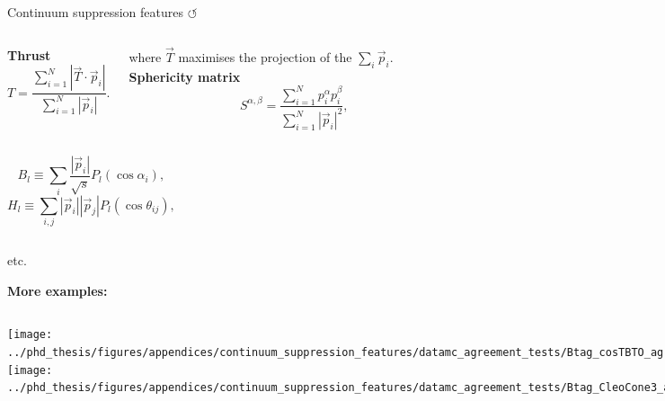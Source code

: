 \documentclass[xcolor=dvipsnames]{beamer}
\begin{document}
\begin{frame}{Continuum suppression features \hyperlink{frame:A}{$\circlearrowleft$}}
\scriptsize\centering
   \begin{columns}
      \centering
      \textbf{Thrust}
      \begin{equation*}\label{eq:thrust}
         T = \frac{\sum^N_{i=1}|\vec{T}\cdot\vec{p}_i|}{\sum^N_{i=1}|\vec{p}_i|}.
     \end{equation*}

     where $\vec{T}$ maximises the projection of the $\sum_i\vec{p}_i$.
     \centering
     \textbf{Sphericity matrix}
     \begin{equation*}
      S^{\alpha,\beta} = \frac{\sum^N_{i=1}p_i^{\alpha}p_i^{\beta}}{\sum^N_{i=1}|\vec{p}_i|^2},
  \end{equation*}
     
   \end{columns}

   \begin{columns}
      \begin{equation*}
         B_l \equiv \sum_i \frac{|\vec{p}_i|}{\sqrt{s}}P_l(\cos\alpha_i),
     \end{equation*}
      \begin{equation}
         H_l \equiv \sum_{i,j} |\vec{p}_i||\vec{p}_j|P_l(\cos\theta_{ij}),
     \end{equation}
   \end{columns}

   \ra etc. 

   \textbf{More examples:}

   \begin{columns}
      \texttt{[image: ../phd\_thesis/figures/appendices/continuum\_suppression\_features/datamc\_agreement\_tests/Btag\_cosTBTO\_agreement\_tested.pdf]}
      \texttt{[image: ../phd\_thesis/figures/appendices/continuum\_suppression\_features/datamc\_agreement\_tests/Btag\_CleoCone3\_agreement\_tested.pdf]}    
   \end{columns}
   
\end{frame}
\end{document}
